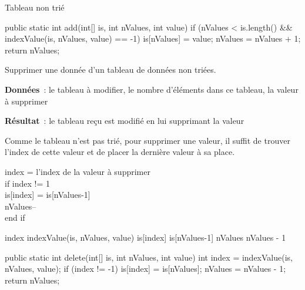 \begin{Fiche}{Tableau non trié}
		\begin{java}
public static int add(int[] is, int nValues, int value){
	if (nValues < is.length() 
			&& indexValue(is, nValues, value) == -1){
		is[nValues] = value;
		nValues = nValues + 1;
	}
	return nValues;
}
		\end{java}




	Supprimer une donnée d'un tableau de données non triées.

	\textbf{Données}~: le tableau à modifier, le nombre d'éléments dans ce
	tableau, la valeur à supprimer
		
	\textbf{Résultat}~: le tableau reçu est modifié en lui supprimant la valeur
	

	Comme le tableau n'est pas trié, pour supprimer une valeur, il suffit de
	trouver l'index de cette valeur et de placer la dernière valeur à sa place. 

	\begin{langagenaturel}
		index = l'index de la valeur à supprimer\\
		if index != 1\\
		\tab is[index] = is[nValues-1]\\
		\tab nValues--\\
		end if\\
	\end{langagenaturel}

		\begin{pseudocode}
				\Let index \Gets indexValue(is, nValues, value)
					\Let is[index] \Gets is[nValues-1]
					\Let nValues \Gets nValues - 1
				\EndIf			
			\EndAlgo
		\end{pseudocode}

		\begin{java}
public static int delete(int[] is, int nValues, int value){
	int index = indexValue(is, nValues, value);
	if (index != -1){
		is[index] = is[nValues];
		nValues = nValues - 1;
	}
	return nValues;
}
		\end{java}



	
\end{Fiche}
